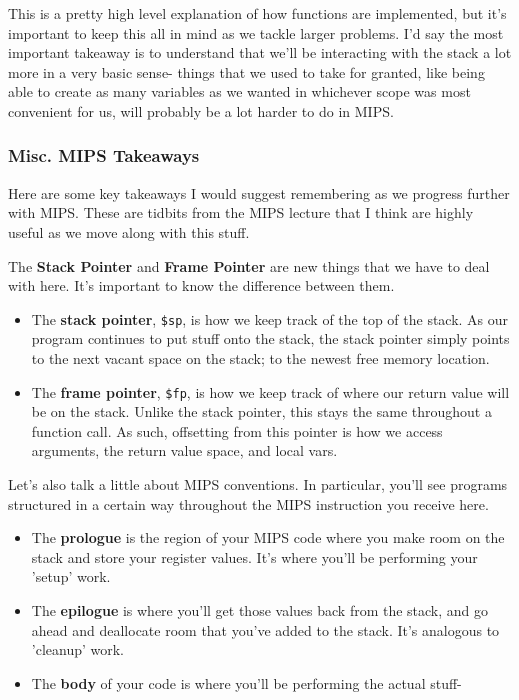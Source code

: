 \documentclass[english, 10pt]{article}
\begin{document}
This is a pretty high level explanation of how functions are implemented, but it's important to keep this all in mind as we tackle larger problems. I'd say the most important takeaway is to understand that we'll be interacting with the stack a lot more in a very basic sense- things that we used to take for granted, like being able to create as many variables as we wanted in whichever scope was most convenient for us, will probably be a lot harder to do in MIPS.

\subsubsection{Misc. MIPS Takeaways}

Here are some key takeaways I would suggest remembering as we progress further with MIPS. These are tidbits from the MIPS lecture that I think are highly useful as we move along with this stuff.\newline

The \textbf{Stack Pointer} and \textbf{Frame Pointer} are new things that we have to deal with here. It's important to know the difference between them.

\begin{itemize}
	\item The \textbf{stack pointer}, \texttt{\$sp}, is how we keep track of the top of the stack. As our program continues to put stuff onto the stack, the stack pointer simply points to the next vacant space on the stack; to the newest free memory location.
	\item The \textbf{frame pointer}, \texttt{\$fp}, is how we keep track of where our return value will be on the stack. Unlike the stack pointer, this stays the same throughout a function call. As such, offsetting from this pointer is how we access arguments, the return value space, and local vars.
\end{itemize}

Let's also talk a little about MIPS conventions. In particular, you'll see programs structured in a certain way throughout the MIPS instruction you receive here.

\begin{itemize}
	\item The \textbf{prologue} is the region of your MIPS code where you make room on the stack and store your register values. It's where you'll be performing your 'setup' work.
	\item The \textbf{epilogue} is where you'll get those values back from the stack, and go ahead and deallocate room that you've added to the stack. It's analogous to 'cleanup' work.
	\item The \textbf{body} of your code is where you'll be performing the actual stuff- 
\end{itemize}
\end{document}
